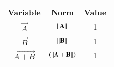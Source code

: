 \begin{center}
    \begin{tabular}{|c|c|c|} 
        \hline
            \textbf{Variable} & \textbf{Norm} & \textbf{Value} \\ 
        \hline
            $\vec{A}$   & $\left\vert\left\vert\mathbf{A}\right\vert\right\vert$ & 1 \\ 
        \hline
            $\vec{B}$   & $\left\vert\left\vert\mathbf{B}\right\vert\right\vert$ & 1 \\ 
        \hline
            $\vec{A+B}$   & $\left(\left\vert\left\vert\mathbf{A}+\mathbf{B}\right\vert\right\vert\right)$ & 1 \\
        \hline
    \end{tabular}
\end{center}  
